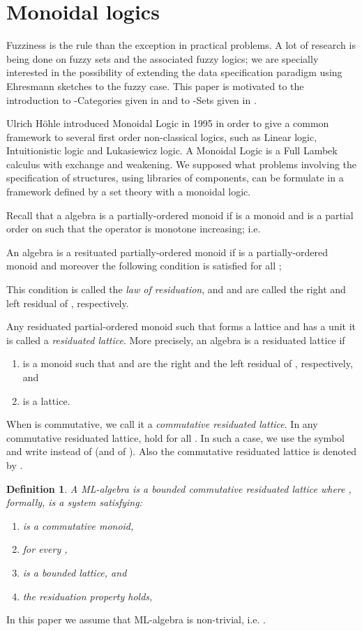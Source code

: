 \documentclass[oribibl]{llncs}
\newtheorem{defn}{Definition}
\begin{document}
\section{Monoidal logics}\label{monoidal logics}
Fuzziness is the rule than the exception in practical problems. A lot of research is being done on fuzzy sets and the associated fuzzy logics; we are specially interested in the possibility of extending the data specification paradigm using Ehresmann sketches to the fuzzy case. This paper is motivated to the introduction to -Categories given in \cite{Clementino04} and to -Sets given in \cite{valverde??}.

Ulrich H\"{o}hle introduced Monoidal Logic in 1995 in order to give a common framework to several first order non-classical logics, such as Linear logic, Intuitionistic logic and Lukasiewicz logic. A Monoidal Logic is a Full Lambek calculus with  exchange and weakening. We supposed what problems involving the specification of structures, using libraries of components, can be formulate in a framework defined by a set theory with a monoidal logic.

Recall that a algebra   is a partially-ordered monoid
if  is a monoid and    is a partial order
on   such that the operator  is monotone
increasing; i.e.


An algebra   is a resituated
partially-ordered monoid if  is a
partially-ordered monoid and moreover the following condition is
satisfied for all ;

This condition is called the \emph{law of residuation}, and  and
 are called the right and left residual of ,
respectively.

Any residuated partial-ordered monoid   such that
 forms a lattice and   has a unit
it is called a \emph{residuated lattice}. More precisely, an algebra
  is a residuated
lattice if
\begin{enumerate}
  \item  is a monoid such that  and  are the right and the left residual
of  , respectively, and
  \item  is a lattice.
\end{enumerate}
When  is commutative, we call it a \emph{commutative residuated
lattice}. In any commutative residuated lattice, 
hold for all . In such a case, we use the symbol 
and write  instead of   (and of
). Also the commutative residuated lattice is denoted by
.

\begin{defn}
A \emph{ML-algebra} is a bounded commutative residuated lattice where
, formally, is a system
 satisfying:
\begin{enumerate}
  \item  is a commutative monoid,
  \item  for every ,
  \item  is a bounded lattice,
  and
  \item the residuation property holds, 
\end{enumerate}
\end{defn}
In this paper we assume that ML-algebra  is non-trivial, i.e. .
\end{document}
